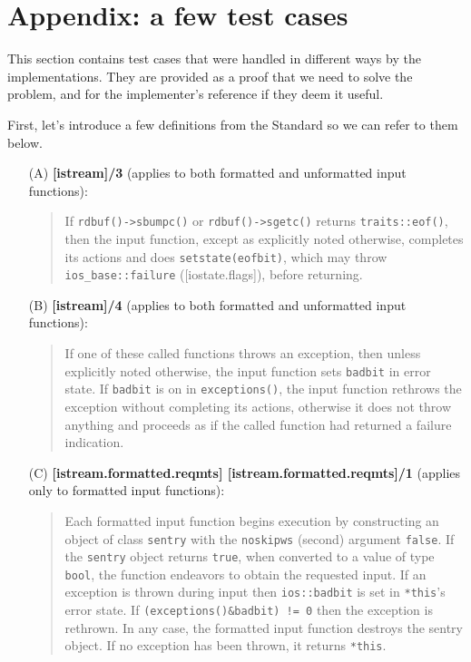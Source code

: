 \documentclass{wg21}
\newcommand{\cc}[1]{\texttt{#1}}
\begin{document}
\section{Appendix: a few test cases}
This section contains test cases that were handled in different ways by the
implementations. They are provided as a proof that we need to solve the problem,
and for the implementer's reference if they deem it useful.

First, let's introduce a few definitions from the Standard so we can refer to
them below.

\begin{enumerate}
  \item[(A)] \textbf{[istream]/3} (applies to both formatted and unformatted input functions):
  \begin{quote}
  If \cc{rdbuf()->sbumpc()} or \cc{rdbuf()->sgetc()} returns \cc{traits::eof()},
  then the input function, except as explicitly noted otherwise, completes its
  actions and does \cc{setstate(eofbit)}, which may throw \cc{ios_base::failure}
  ([iostate.flags]), before returning.
  \end{quote}

  \item[(B)] \textbf{[istream]/4} (applies to both formatted and unformatted input functions):
  \begin{quote}
  If one of these called functions throws an exception, then unless explicitly
  noted otherwise, the input function sets \cc{badbit} in error state. If
  \cc{badbit} is on in \cc{exceptions()}, the input function rethrows the
  exception without completing its actions, otherwise it does not throw
  anything and proceeds as if the called function had returned a failure
  indication.
  \end{quote}

  \item[(C)] \textbf{[istream.formatted.reqmts] [istream.formatted.reqmts]/1} (applies only to formatted input functions):
  \begin{quote}
  Each formatted input function begins execution by constructing an object of
  class \cc{sentry} with the \cc{noskipws} (second) argument \cc{false}. If
  the \texttt{sentry} object returns \cc{true}, when converted to a value of type
  \cc{bool}, the function endeavors to obtain the requested input. If an exception
  is thrown during input then \cc{ios::badbit} is set in \cc{*this}'s error
  state. If \cc{(exceptions()&badbit) != 0} then the exception is rethrown. In
  any case, the formatted input function destroys the sentry object. If no
  exception has been thrown, it returns \cc{*this}.
  \end{quote}


\end{enumerate}
\end{document}
